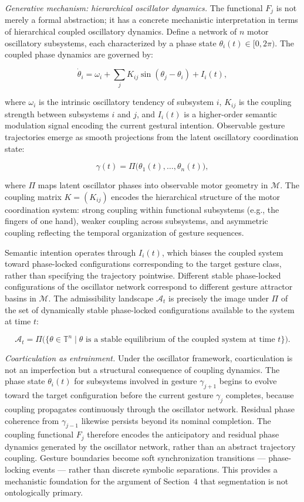 \documentclass[11pt, a4paper]{article}
\theoremstyle{definition}
\begin{document}
\textit{Generative mechanism: hierarchical oscillator dynamics.} The functional $F_j$ is not merely a formal abstraction; it has a concrete mechanistic interpretation in terms of hierarchical coupled oscillatory dynamics. Define a network of $n$ motor oscillatory subsystems, each characterized by a phase state $\theta_i(t) \in [0, 2\pi)$. The coupled phase dynamics are governed by:

\[
\dot{\theta}_i = \omega_i + \sum_{j} K_{ij} \sin(\theta_j - \theta_i) + I_i(t),
\]

where $\omega_i$ is the intrinsic oscillatory tendency of subsystem $i$, $K_{ij}$ is the coupling strength between subsystems $i$ and $j$, and $I_i(t)$ is a higher-order semantic modulation signal encoding the current gestural intention. Observable gesture trajectories emerge as smooth projections from the latent oscillatory coordination state:

\[
\gamma(t) = \Pi\bigl(\theta_1(t), \ldots, \theta_n(t)\bigr),
\]

where $\Pi$ maps latent oscillator phases into observable motor geometry in $\mathcal{M}$. The coupling matrix $K = (K_{ij})$ encodes the hierarchical structure of the motor coordination system: strong coupling within functional subsystems (e.g., the fingers of one hand), weaker coupling across subsystems, and asymmetric coupling reflecting the temporal organization of gesture sequences.

Semantic intention operates through $I_i(t)$, which biases the coupled system toward phase-locked configurations corresponding to the target gesture class, rather than specifying the trajectory pointwise. Different stable phase-locked configurations of the oscillator network correspond to different gesture attractor basins in $\mathcal{M}$. The admissibility landscape $\mathcal{A}_t$ is precisely the image under $\Pi$ of the set of dynamically stable phase-locked configurations available to the system at time $t$:

\[
\mathcal{A}_t = \Pi\bigl(\{\theta \in \mathbb{T}^n \mid \theta \text{ is a stable equilibrium of the coupled system at time } t\}\bigr).
\]

\textit{Coarticulation as entrainment.} Under the oscillator framework, coarticulation is not an imperfection but a structural consequence of coupling dynamics. The phase state $\theta_i(t)$ for subsystems involved in gesture $\gamma_{j+1}$ begins to evolve toward the target configuration before the current gesture $\gamma_j$ completes, because coupling propagates continuously through the oscillator network. Residual phase coherence from $\gamma_{j-1}$ likewise persists beyond its nominal completion. The coupling functional $F_j$ therefore encodes the anticipatory and residual phase dynamics generated by the oscillator network, rather than an abstract trajectory coupling. Gesture boundaries become soft synchronization transitions --- phase-locking events --- rather than discrete symbolic separations. This provides a mechanistic foundation for the argument of Section~4 that segmentation is not ontologically primary.
\end{document}
